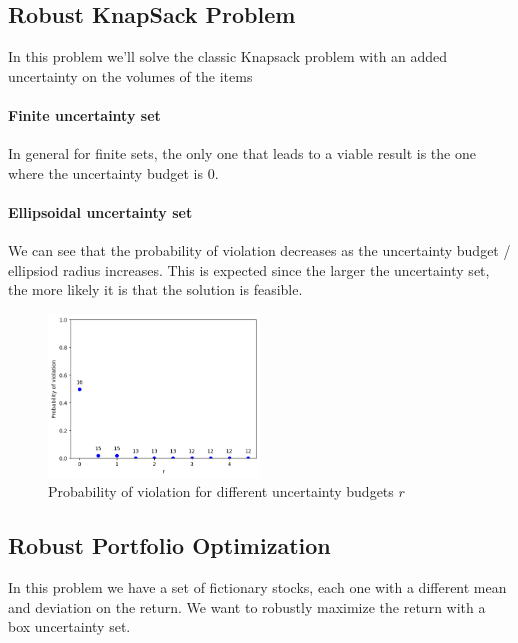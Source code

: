\subsection{Robust KnapSack Problem}
In this problem we'll solve the classic Knapsack problem with an added uncertainty on the volumes of the items

\paragraph*{Finite uncertainty set}
In general for finite sets, the only one that leads to a viable result is the one where the uncertainty budget is 0.

\paragraph*{Ellipsoidal uncertainty set}
We can see that the probability of violation decreases as the uncertainty budget / ellipsiod radius increases. This is expected since the larger the uncertainty set, the more likely it is that the solution is feasible.
\begin{figure}[H]
    \centering
    \includegraphics[width=0.5\textwidth]{lab12/imgs/ellips.png}
    \caption{Probability of violation for different uncertainty budgets $r$}
    \label{fig:ellips}
\end{figure}

\subsection{Robust Portfolio Optimization}
In this problem we have a set of fictionary stocks, each one with a different mean and deviation on the return.
We want to robustly maximize the return with a box uncertainty set.

